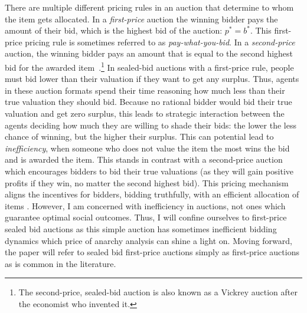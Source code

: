 \documentclass[12pt,twoside]{reedthesis}
\begin{document}
There are multiple different pricing rules in an auction that determine to whom the item gets allocated. In a {\em first-price} auction the winning bidder pays the amount of their bid, which is the highest bid of the auction: $p^* = b^*$. This first-price pricing rule is sometimes referred to as {\em pay-what-you-bid}. In a {\em second-price} auction, the winning bidder pays an amount that is equal to the second highest bid for the awarded item~\citep{Vickrey1961}.\footnote{The second-price, sealed-bid auction is also known as a Vickrey auction after the economist who invented it.} In sealed-bid auctions with a first-price rule, people must bid lower than their valuation if they want to get any surplus. Thus, agents in these auction formats spend their time reasoning how much less than their true valuation they should bid. Because no rational bidder would bid their true valuation and get zero surplus, this leads to strategic interaction between the agents deciding how much they are willing to shade their bids: the lower the less chance of winning, but the higher their surplus. This can potential lead to {\em inefficiency}, when someone who does not value the item the most wins the bid and is awarded the item. This stands in contrast with a second-price auction which encourages bidders to bid their true valuations (as they will gain positive profits if they win, no matter the second highest bid). This pricing mechanism aligns the incentives for bidders, bidding truthfully, with an efficient allocation of items \citep{Mochon2015}. However, I am concerned with inefficiency in auctions, not ones which guarantee optimal social outcomes. Thus, I will confine ourselves to first-price sealed bid auctions as this simple auction has sometimes inefficient bidding dynamics which price of anarchy analysis can shine a light on. Moving forward, the paper will refer to sealed bid first-price auctions simply as first-price auctions as is common in the literature. 
\end{document}
